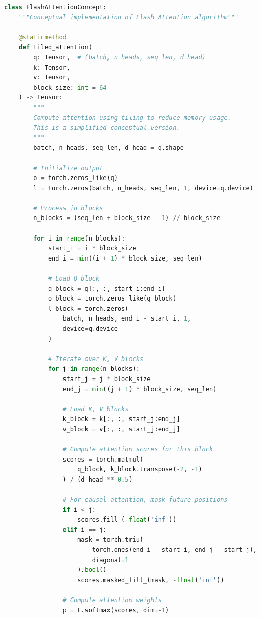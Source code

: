 \documentclass[11pt]{article}
\begin{document}
\begin{lstlisting}[language=Python, caption=Flash Attention Concept]
class FlashAttentionConcept:
    """Conceptual implementation of Flash Attention algorithm"""
    
    @staticmethod
    def tiled_attention(
        q: Tensor,  # (batch, n_heads, seq_len, d_head)
        k: Tensor,
        v: Tensor,
        block_size: int = 64
    ) -> Tensor:
        """
        Compute attention using tiling to reduce memory usage.
        This is a simplified conceptual version.
        """
        batch, n_heads, seq_len, d_head = q.shape
        
        # Initialize output
        o = torch.zeros_like(q)
        l = torch.zeros(batch, n_heads, seq_len, 1, device=q.device)
        
        # Process in blocks
        n_blocks = (seq_len + block_size - 1) // block_size
        
        for i in range(n_blocks):
            start_i = i * block_size
            end_i = min((i + 1) * block_size, seq_len)
            
            # Load Q block
            q_block = q[:, :, start_i:end_i]
            o_block = torch.zeros_like(q_block)
            l_block = torch.zeros(
                batch, n_heads, end_i - start_i, 1, 
                device=q.device
            )
            
            # Iterate over K, V blocks
            for j in range(n_blocks):
                start_j = j * block_size
                end_j = min((j + 1) * block_size, seq_len)
                
                # Load K, V blocks
                k_block = k[:, :, start_j:end_j]
                v_block = v[:, :, start_j:end_j]
                
                # Compute attention scores for this block
                scores = torch.matmul(
                    q_block, k_block.transpose(-2, -1)
                ) / (d_head ** 0.5)
                
                # For causal attention, mask future positions
                if i < j:
                    scores.fill_(-float('inf'))
                elif i == j:
                    mask = torch.triu(
                        torch.ones(end_i - start_i, end_j - start_j),
                        diagonal=1
                    ).bool()
                    scores.masked_fill_(mask, -float('inf'))
                
                # Compute attention weights
                p = F.softmax(scores, dim=-1)
                

\end{lstlisting}
\end{document}
